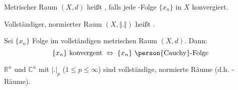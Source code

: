 \begin{definition}[Vollständigkeit]
	Metrischer Raum $(X,d)$ heißt , falls jede -Folge $\{x_n\}$ in $X$ konvergiert.
	
	Vollständiger, normierter Raum $(X,\Vert .\Vert)$ heißt .
\end{definition}
\begin{conclusion}
	Sei $\{x_n\}$ Folge im vollständigen metrischen Raum $(X,d)$. Dann:\[ \{x_n\}\text{ konvergent}\;\Leftrightarrow\; \{x_n\} \text{ \person{Cauchy}-Folge} \]
\end{conclusion}
\begin{theorem}
	$\mathbb{R}^n$ und $\mathbb{C}^n$ mit $|.|_p$ ($1\le p \le \infty$) sind vollständige, normierte Räume (d.h. -Räume).
\end{theorem}